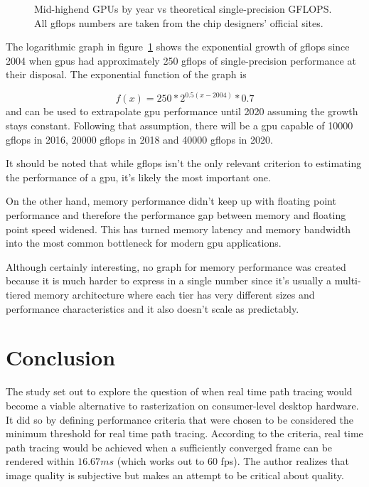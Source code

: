 \documentclass[
  twoside,
  11pt, a4paper,
  footinclude=true,
  headinclude=true,
  cleardoublepage=empty
]{scrreprt}
\begin{document}
\begin{figure}[H]
    \centering
    \caption{Mid-highend GPUs by year vs theoretical single-precision GFLOPS.
    All \ac{gflops} numbers are taken from the chip designers' official sites.}
    \label{fig:gpus-by-year}
\end{figure}

The logarithmic graph in figure~\ref{fig:gpus-by-year} shows the exponential growth of \ac{gflops} since 2004
when \acp{gpu} had approximately 250 \ac{gflops} of single-precision performance at their disposal.
The exponential function of the graph is

\[ f(x) = 250 * 2 ^ {0.5 (x-2004)} * 0.7 \]
and can be used to extrapolate \ac{gpu} performance until 2020 assuming the growth stays constant.
Following that assumption, there will be a \ac{gpu} capable of 10000 \ac{gflops} in 2016, 20000
\ac{gflops} in 2018 and 40000 \ac{gflops} in 2020.

It should be noted that while \ac{gflops} isn't the only relevant criterion to estimating the
performance of a \ac{gpu}, it's likely the most important one.

On the other hand, memory performance didn't keep up with floating point performance and therefore
the performance gap between memory and floating point speed widened. This has turned memory latency
and memory bandwidth into the most common bottleneck for modern \ac{gpu} applications.

Although certainly interesting, no graph for memory performance was created because
it is much harder to express in a single number since it's usually
a multi-tiered memory architecture where each tier has very different sizes
and performance characteristics and it also doesn't scale as predictably.

\chapter{Conclusion}
The study set out to explore the question of when real time path tracing would become
a viable alternative to rasterization on consumer-level desktop hardware. It did so by defining
performance criteria that were chosen to be considered the minimum threshold for real time path tracing.
According to the criteria, real time path tracing would be achieved when a sufficiently converged
frame can be rendered within \(16.67ms\) (which works out to 60 \ac{fps}). The author realizes that
image quality is subjective but makes an attempt to be critical about quality.
\end{document}
